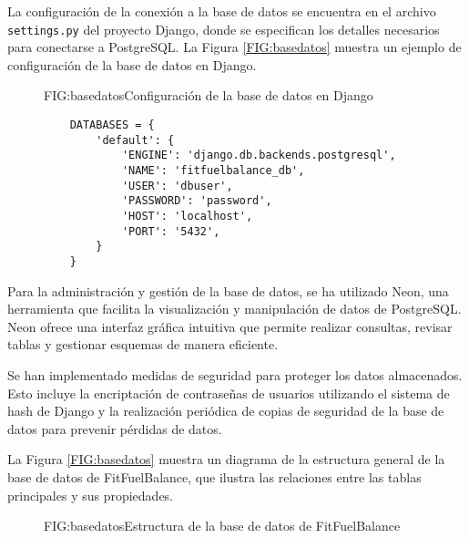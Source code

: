 La configuración de la conexión a la base de datos se encuentra en el archivo \texttt{settings.py} del proyecto Django, donde se especifican los detalles necesarios para conectarse a PostgreSQL. La Figura \ref{FIG:basedatos} muestra un ejemplo de configuración de la base de datos en Django.

\begin{figure}[Configuración Base de Datos]{FIG:basedatos}{Configuración de la base de datos en Django}
\begin{verbatim}
    DATABASES = {
        'default': {
            'ENGINE': 'django.db.backends.postgresql',
            'NAME': 'fitfuelbalance_db',
            'USER': 'dbuser',
            'PASSWORD': 'password',
            'HOST': 'localhost',
            'PORT': '5432',
        }
    }
\end{verbatim}
\end{figure}

Para la administración y gestión de la base de datos, se ha utilizado Neon, una herramienta que facilita la visualización y manipulación de datos de PostgreSQL. Neon ofrece una interfaz gráfica intuitiva que permite realizar consultas, revisar tablas y gestionar esquemas de manera eficiente.

Se han implementado medidas de seguridad para proteger los datos almacenados. Esto incluye la encriptación de contraseñas de usuarios utilizando el sistema de hash de Django y la realización periódica de copias de seguridad de la base de datos para prevenir pérdidas de datos.

La Figura \ref{FIG:basedatos} muestra un diagrama de la estructura general de la base de datos de FitFuelBalance, que ilustra las relaciones entre las tablas principales y sus propiedades.

\begin{figure}[Estructura Base de Datos]{FIG:basedatos}{Estructura de la base de datos de FitFuelBalance}
\end{figure}
